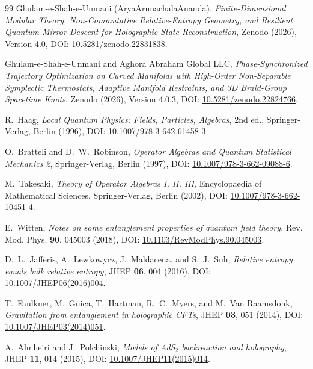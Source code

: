 \documentclass[11pt,a4paper]{article}
\theoremstyle{plain}
\theoremstyle{definition}
\begin{document}
\begin{thebibliography}{99}
Ghulam-e-Shah-e-Unmani (AryaArunachalaAnanda),
\textit{Finite-Dimensional Modular Theory, Non-Commutative Relative-Entropy Geometry, and Resilient Quantum Mirror Descent for Holographic State Reconstruction},
Zenodo (2026), Version 4.0, DOI: \href{https://doi.org/10.5281/zenodo.22831838}{10.5281/zenodo.22831838}.

Ghulam-e-Shah-e-Unmani and Aghora Abraham Global LLC,
\textit{Phase-Synchronized Trajectory Optimization on Curved Manifolds with High-Order Non-Separable Symplectic Thermostats, Adaptive Manifold Restraints, and 3D Braid-Group Spacetime Knots},
Zenodo (2026), Version 4.0.3, DOI: \href{https://doi.org/10.5281/zenodo.22824766}{10.5281/zenodo.22824766}.

R.~Haag, \textit{Local Quantum Physics: Fields, Particles, Algebras}, 2nd ed., Springer-Verlag, Berlin (1996), DOI: \href{https://doi.org/10.1007/978-3-642-61458-3}{10.1007/978-3-642-61458-3}.

O.~Bratteli and D.~W.~Robinson, \textit{Operator Algebras and Quantum Statistical Mechanics 2}, Springer-Verlag, Berlin (1997), DOI: \href{https://doi.org/10.1007/978-3-662-09088-6}{10.1007/978-3-662-09088-6}.

M.~Takesaki, \textit{Theory of Operator Algebras I, II, III}, Encyclopaedia of Mathematical Sciences, Springer-Verlag, Berlin (2002), DOI: \href{https://doi.org/10.1007/978-3-662-10451-4}{10.1007/978-3-662-10451-4}.

E.~Witten, \textit{Notes on some entanglement properties of quantum field theory}, Rev. Mod. Phys. \textbf{90}, 045003 (2018), DOI: \href{https://doi.org/10.1103/RevModPhys.90.045003}{10.1103/RevModPhys.90.045003}.

D.~L.~Jafferis, A.~Lewkowycz, J.~Maldacena, and S.~J.~Suh, \textit{Relative entropy equals bulk relative entropy}, JHEP \textbf{06}, 004 (2016), DOI: \href{https://doi.org/10.1007/JHEP06(2016)004}{10.1007/JHEP06(2016)004}.

T.~Faulkner, M.~Guica, T.~Hartman, R.~C.~Myers, and M.~Van Raamsdonk, \textit{Gravitation from entanglement in holographic CFTs}, JHEP \textbf{03}, 051 (2014), DOI: \href{https://doi.org/10.1007/JHEP03(2014)051}{10.1007/JHEP03(2014)051}.

A.~Almheiri and J.~Polchinski, \textit{Models of AdS$_2$ backreaction and holography}, JHEP \textbf{11}, 014 (2015), DOI: \href{https://doi.org/10.1007/JHEP11(2015)014}{10.1007/JHEP11(2015)014}.


\end{thebibliography}
\end{document}
